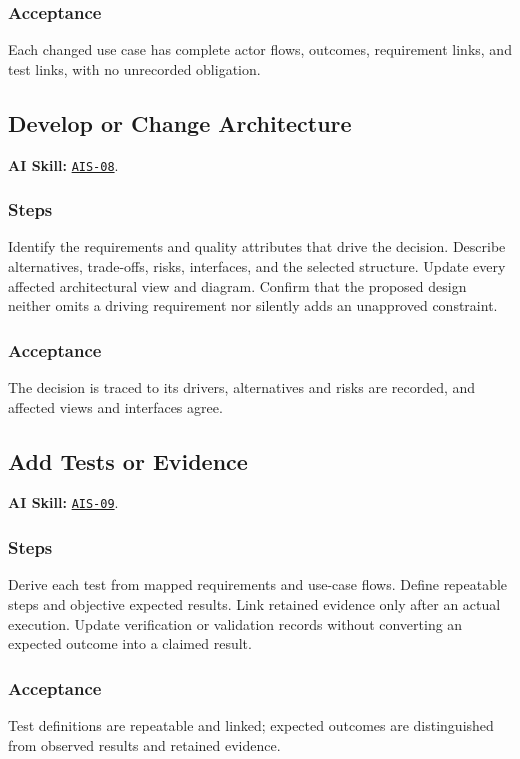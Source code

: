 \subsubsection*{Acceptance}
\label{Section:AIUseCaseAcceptance}
Each changed use case has complete actor flows, outcomes, requirement links, and test links, with no unrecorded obligation.

\subsection{Develop or Change Architecture}
\label{Section:AIArchitectureSteps}
\noindent\textbf{AI Skill:} \hyperref[Skill:AIS-08]{\texttt{AIS-08}}.

\subsubsection*{Steps}
\label{Section:AIArchitectureTaskSteps}
Identify the requirements and quality attributes that drive the decision.
Describe alternatives, trade-offs, risks, interfaces, and the selected
structure. Update every affected architectural view and diagram. Confirm that
the proposed design neither omits a driving requirement nor silently adds an
unapproved constraint.

\subsubsection*{Acceptance}
\label{Section:AIArchitectureAcceptance}
The decision is traced to its drivers, alternatives and risks are recorded, and affected views and interfaces agree.

\subsection{Add Tests or Evidence}
\label{Section:AITestSteps}
\noindent\textbf{AI Skill:} \hyperref[Skill:AIS-09]{\texttt{AIS-09}}.

\subsubsection*{Steps}
\label{Section:AITestTaskSteps}
Derive each test from mapped requirements and use-case flows. Define repeatable
steps and objective expected results. Link retained evidence only after an
actual execution. Update verification or validation records without converting
an expected outcome into a claimed result.

\subsubsection*{Acceptance}
\label{Section:AITestAcceptance}
Test definitions are repeatable and linked; expected outcomes are distinguished from observed results and retained evidence.

